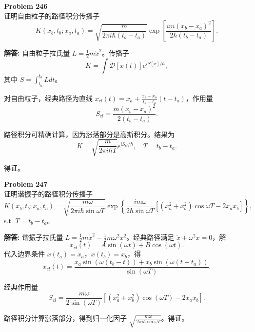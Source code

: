 \documentclass[12pt, a4paper, oneside]{ctexart}
\newenvironment{solution}{\par\noindent\textbf{解答:}\quad}{\par}
\begin{document}
\begin{mdframed}[backgroundcolor=gray!10, linewidth=0pt]
    \textbf{Problem 246} \\
    证明自由粒子的路径积分传播子
    \[
    K(x_b, t_b; x_a, t_a) = \sqrt{\frac{m}{2\pi i \hbar (t_b - t_a)}} \exp\left[ \frac{i m (x_b - x_a)^2}{2\hbar (t_b - t_a)} \right].
    \]
\end{mdframed}
\begin{solution}
    自由粒子拉氏量 $L = \frac{1}{2} m \dot{x}^2$。传播子
    \[
    K = \int \mathcal{D}[x(t)] e^{i S[x]/\hbar},
    \]
    其中 $S = \int_{t_a}^{t_b} L dt$。
    
    对自由粒子，经典路径为直线 $x_{cl}(t) = x_a + \frac{x_b - x_a}{t_b - t_a} (t - t_a)$，作用量
    \[
    S_{cl} = \frac{m (x_b - x_a)^2}{2(t_b - t_a)}.
    \]
    
    路径积分可精确计算，因为涨落部分是高斯积分。结果为
    \[
    K = \sqrt{\frac{m}{2\pi i \hbar T}} e^{i S_{cl}/\hbar}, \quad T = t_b - t_a.
    \]
    
    得证。
\end{solution}

\begin{mdframed}[backgroundcolor=gray!10, linewidth=0pt]
    \textbf{Problem 247} \\
    证明谐振子的路径积分传播子
    \[
    K(x_b, t_b; x_a, t_a) = \sqrt{\frac{m\omega}{2\pi i \hbar \sin \omega T}} \exp\left\{ \frac{i m\omega}{2\hbar \sin \omega T} \left[ (x_a^2 + x_b^2) \cos \omega T - 2 x_a x_b \right] \right\},
    \]
    s.t. $T = t_b - t_a$。
\end{mdframed}
\begin{solution}
    谐振子拉氏量 $L = \frac{1}{2} m \dot{x}^2 - \frac{1}{2} m \omega^2 x^2$。经典路径满足 $\ddot{x} + \omega^2 x = 0$，解
    \[
    x_{cl}(t) = A \sin(\omega t) + B \cos(\omega t).
    \]
    代入边界条件 $x(t_a)=x_a$，$x(t_b)=x_b$，得
    \[
    x_{cl}(t) = \frac{x_a \sin(\omega (t_b - t)) + x_b \sin(\omega (t - t_a))}{\sin(\omega T)}.
    \]
    
    经典作用量
    \[
    S_{cl} = \frac{m\omega}{2\sin(\omega T)} \left[ (x_a^2 + x_b^2) \cos(\omega T) - 2 x_a x_b \right].
    \]
    
    路径积分计算涨落部分，得到归一化因子 $\sqrt{\frac{m\omega}{2\pi i \hbar \sin \omega T}}$。得证。
\end{solution}
\end{document}
